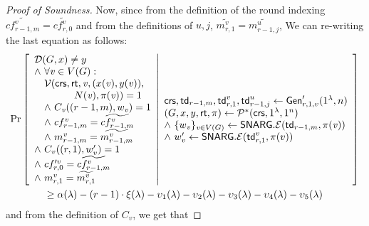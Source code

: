 \begin{proof}[Proof of Soundness]
Now, since from the definition of the round indexing $\widetilde{cf^v_{r-1,m}} = \widetilde{cf^v_{r,0}}$ and from the definitions of $u,j$, $\widetilde{m^v_{r,1}} = \widetilde{m^u_{r-1, j}}$, We can re-writing the last equation as follows:
\begin{gather*}
    \Pr \left[ \begin{array}{ll} 
    \mathcal{D}(G, x)\neq y  \\
    \wedge\ \forall \mathit{ v }\in V(G) : \\
    \quad \mathcal{V}(\mathsf{crs}, \mathsf{rt}, \mathit{ v }, (x(\mathit{ v }), y(\mathit{ v })),\\
    \qquad \qquad N(\mathit{ v }), \pi(\mathit{ v })) = 1 \\
    \quad \wedge ~C_{\mathit{ v }}((r-1, m), w_{\mathit{ v }}) = 1 \\
    \quad \wedge ~cf^{\mathit{ v }}_{r-1, m} = \widetilde{cf^{\mathit{ v }}_{r-1,m}} \\
    \quad \wedge ~m^{\mathit{ v }}_{r-1,m} = \widetilde{m^{\mathit{ v }}_{r-1,m}} \\
    \wedge ~C_v((r,1),w'_v) = 1 \\
    \wedge ~cf'^v_{r,0} = \widetilde{cf^v_{r-1,m}} \\
    \wedge ~m^v_{r,1} = \widetilde{m^v_{r,1}}
     \end{array} \middle\vert \begin{array}{ll} 
    \mathsf{crs}, \mathsf{td}_{r-1,m}, \mathsf{td}^v_{r,1}, \mathsf{td}^{u}_{r-1, j}\leftarrow \mathsf{Gen}'_{r,1,v}(1^\lambda, n) \\
    (G, x, y, \mathsf{rt}, \pi) \leftarrow \mathcal{P}^*(\mathsf{crs}, 1^\lambda, 1^n)\\
    \wedge ~\{w_{\mathit{ v }}\}_{\mathit{ v }\in V(G)}\leftarrow \mathsf{SNARG}.\mathcal{E}(\mathsf{td}_{r-1,m}, \pi(\mathit{ v })) \\
    \wedge ~w'_v\leftarrow \mathsf{SNARG}.\mathcal{E}(\mathsf{td}^v_{r,1}, \pi(v)) \\
     \end{array} \right]\\
    \geq \alpha(\lambda) - (r-1)\cdot\xi(\lambda) - \upsilon_1(\lambda) - \upsilon_2(\lambda) - \upsilon_3(\lambda) - \upsilon_4(\lambda) - \upsilon_5(\lambda)
\end{gather*}
and from the definition of $C_v$, we get that


\end{proof}
